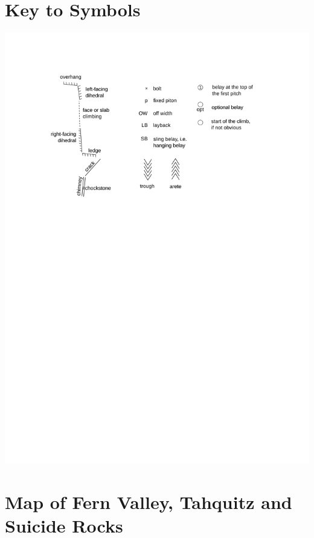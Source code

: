 \documentclass{tahquitz}
\begin{document}
\tableofcontents

\vfill\pagebreak

\discussionparindent


\section{Key to Symbols}

\vspace{10mm}

\includegraphics[width=\linewidth]{figs/key}

\vfill

\pagebreak


\section{Map of Fern Valley, Tahquitz and Suicide Rocks}
\end{document}
